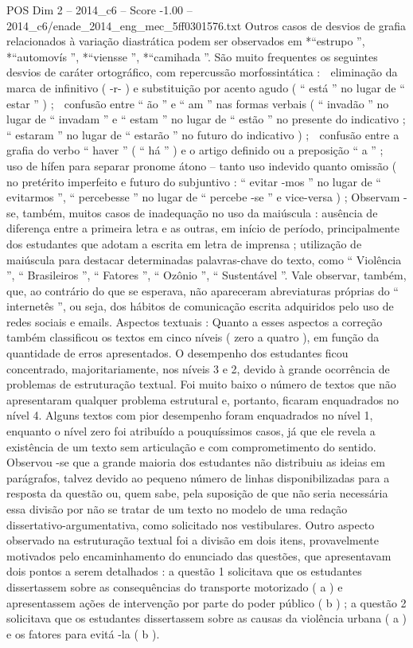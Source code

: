\begin{textsample}{POS Dim 2 – 2014\_c6 – Score -1.00 – 2014\_c6/enade\_2014\_eng\_mec\_5ff0301576.txt}
Outros casos de desvios de grafia relacionados à variação diastrática podem ser observados em *“estrupo ”, *“automovís ”, *“viensse ”, *“camihada ”.
São muito frequentes os seguintes desvios de caráter ortográfico, com repercussão morfossintática :  eliminação da marca de infinitivo ( -r- ) e substituição por acento agudo ( “ está ” no lugar de “ estar ” ) ;  confusão entre “ ão ” e “ am ” nas formas verbais ( “ invadão ” no lugar de “ invadam ” e “ estam ” no lugar de “ estão ” no presente do indicativo ; “ estaram ” no lugar de “ estarão ” no futuro do indicativo ) ;  confusão entre a grafia do verbo “ haver ” ( “ há ” ) e o artigo definido ou a preposição “ a ” ;  uso de hífen para separar pronome átono – tanto uso indevido quanto omissão ( no pretérito imperfeito e futuro do subjuntivo : “ evitar -mos ” no lugar de “ evitarmos ”, “ percebesse ” no lugar de “ percebe -se ” e vice-versa ) ; Observam -se, também, muitos casos de inadequação no uso da maiúscula : ausência de diferença entre a primeira letra e as outras, em início de período, principalmente dos estudantes que adotam a escrita em letra de imprensa ; utilização de maiúscula para destacar determinadas palavras-chave do texto, como “ Violência ”, “ Brasileiros ”, “ Fatores ”, “ Ozônio ”, “ Sustentável ”.
Vale observar, também, que, ao contrário do que se esperava, não apareceram abreviaturas próprias do “ internetês ”, ou seja, dos hábitos de comunicação escrita adquiridos pelo uso de redes sociais e emails.
Aspectos textuais : Quanto a esses aspectos a correção também classificou os textos em cinco níveis ( zero a quatro ), em função da quantidade de erros apresentados.
O desempenho dos estudantes ficou concentrado, majoritariamente, nos níveis 3 e 2, devido à grande ocorrência de problemas de estruturação textual.
Foi muito baixo o número de textos que não apresentaram qualquer problema estrutural e, portanto, ficaram enquadrados no nível 4.
Alguns textos com pior desempenho foram enquadrados no nível 1, enquanto o nível zero foi atribuído a pouquíssimos casos, já que ele revela a existência de um texto sem articulação e com comprometimento do sentido.
Observou -se que a grande maioria dos estudantes não distribuiu as ideias em parágrafos, talvez devido ao pequeno número de linhas disponibilizadas para a resposta da questão ou, quem sabe, pela suposição de que não seria necessária essa divisão por não se tratar de um texto no modelo de uma redação dissertativo-argumentativa, como solicitado nos vestibulares.
Outro aspecto observado na estruturação textual foi a divisão em dois itens, provavelmente motivados pelo encaminhamento do enunciado das questões, que apresentavam dois pontos a serem detalhados : a questão 1 solicitava que os estudantes dissertassem sobre as consequências do transporte motorizado ( a ) e apresentassem ações de intervenção por parte do poder público ( b ) ; a questão 2 solicitava que os estudantes dissertassem sobre as causas da violência urbana ( a ) e os fatores para evitá -la ( b ).

\end{textsample}
